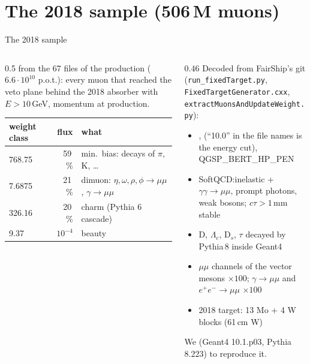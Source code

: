 \documentclass[aspectratio=169,10pt]{beamer}
\begin{document}
\section{The 2018 sample (506\,M muons)}

\begin{frame}{The 2018 sample}
  \begin{columns}[c]
    \begin{column}{0.5\textwidth}\footnotesize
       from the 67 files of the  production ($6.6\cdot10^{10}$ p.o.t.): every muon that reached the veto plane behind the 2018 absorber with $E>10$\,GeV, momentum at production.\\[2mm]
      \begin{tabular}{@{}lrl@{}}
        \toprule
        weight class & flux & what\\
        \midrule
        768.75 & 59\,\% & min.\ bias: decays of $\pi$, K, \dots\\
        7.6875 & 21\,\% & dimuon: $\eta,\omega,\rho,\phi \to \mu\mu$, $\gamma\to\mu\mu$\\
        326.16 & 20\,\% & charm (Pythia 6 cascade)\\
        9.37 & $10^{-4}$ & beauty\\
        \bottomrule
      \end{tabular}
    \end{column}
    \begin{column}{0.46\textwidth}\footnotesize
      Decoded from FairShip's git (\texttt{run\_fixedTarget.py}, \texttt{FixedTargetGenerator.cxx}, \texttt{extractMuonsAndUpdateWeight.py}):
      \begin{itemize}\footnotesize
        \item {},  (“10.0” in the file names is the energy cut), QGSP\_BERT\_HP\_PEN
        \item SoftQCD:inelastic + $\gamma\gamma\to\mu\mu$, prompt photons, weak bosons; $c\tau > 1$\,mm stable
        \item D, $\Lambda_c$, D$_s$, $\tau$ decayed by Pythia\,8 inside Geant4
        \item $\mu\mu$ channels of the vector mesons $\times100$; $\gamma\to\mu\mu$ and $e^+e^-\to\mu\mu$ $\times100$
        \item 2018 target: 13 Mo + 4 W blocks (61\,cm W)
      \end{itemize}
      We  (Geant4 10.1.p03, Pythia 8.223) to reproduce it.
    \end{column}
  \end{columns}
\end{frame}
\end{document}
